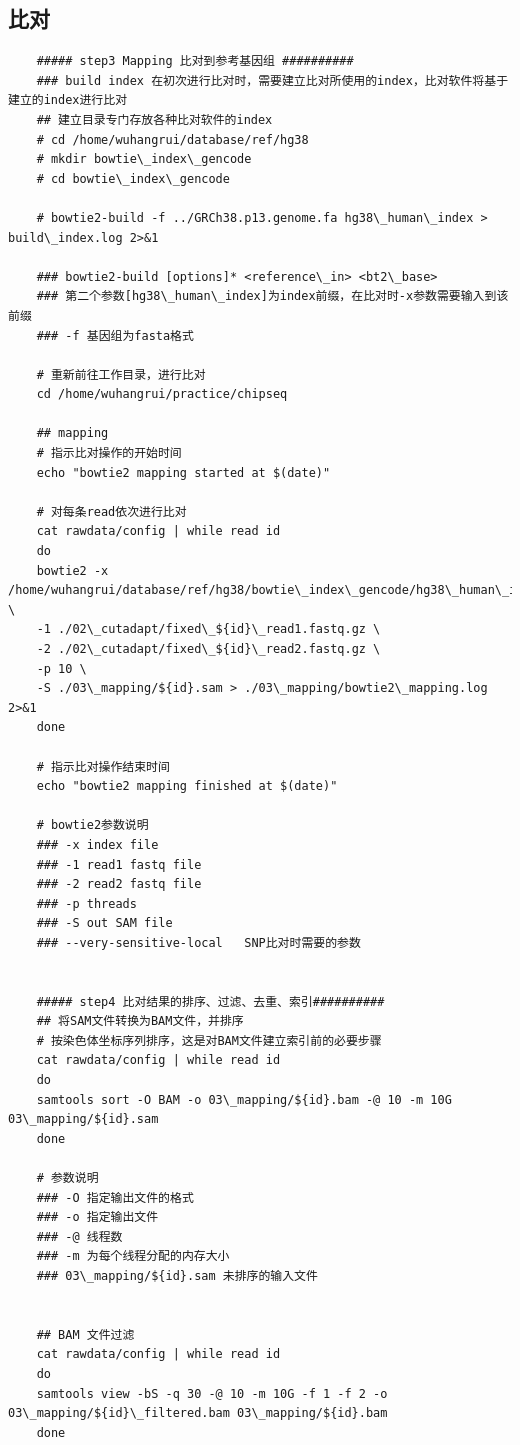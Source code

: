 \subsection{比对}
\begin{lstlisting}
    ##### step3 Mapping 比对到参考基因组 ##########
    ### build index 在初次进行比对时，需要建立比对所使用的index，比对软件将基于建立的index进行比对
    ## 建立目录专门存放各种比对软件的index
    # cd /home/wuhangrui/database/ref/hg38
    # mkdir bowtie\_index\_gencode
    # cd bowtie\_index\_gencode

    # bowtie2-build -f ../GRCh38.p13.genome.fa hg38\_human\_index > build\_index.log 2>&1 

    ### bowtie2-build [options]* <reference\_in> <bt2\_base>
    ### 第二个参数[hg38\_human\_index]为index前缀，在比对时-x参数需要输入到该前缀
    ### -f 基因组为fasta格式

    # 重新前往工作目录，进行比对
    cd /home/wuhangrui/practice/chipseq

    ## mapping
    # 指示比对操作的开始时间
    echo "bowtie2 mapping started at $(date)"

    # 对每条read依次进行比对
    cat rawdata/config | while read id
    do
    bowtie2 -x /home/wuhangrui/database/ref/hg38/bowtie\_index\_gencode/hg38\_human\_index \
    -1 ./02\_cutadapt/fixed\_${id}\_read1.fastq.gz \
    -2 ./02\_cutadapt/fixed\_${id}\_read2.fastq.gz \
    -p 10 \
    -S ./03\_mapping/${id}.sam > ./03\_mapping/bowtie2\_mapping.log 2>&1
    done

    # 指示比对操作结束时间
    echo "bowtie2 mapping finished at $(date)"

    # bowtie2参数说明
    ### -x index file
    ### -1 read1 fastq file
    ### -2 read2 fastq file
    ### -p threads
    ### -S out SAM file
    ### --very-sensitive-local   SNP比对时需要的参数


    ##### step4 比对结果的排序、过滤、去重、索引##########
    ## 将SAM文件转换为BAM文件，并排序
    # 按染色体坐标序列排序，这是对BAM文件建立索引前的必要步骤
    cat rawdata/config | while read id
    do
    samtools sort -O BAM -o 03\_mapping/${id}.bam -@ 10 -m 10G 03\_mapping/${id}.sam
    done

    # 参数说明
    ### -O 指定输出文件的格式
    ### -o 指定输出文件
    ### -@ 线程数
    ### -m 为每个线程分配的内存大小
    ### 03\_mapping/${id}.sam 未排序的输入文件


    ## BAM 文件过滤
    cat rawdata/config | while read id
    do
    samtools view -bS -q 30 -@ 10 -m 10G -f 1 -f 2 -o 03\_mapping/${id}\_filtered.bam 03\_mapping/${id}.bam
    done


\end{lstlisting}
